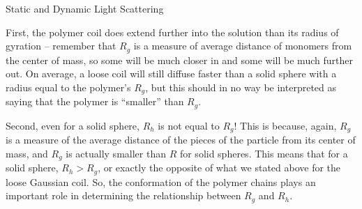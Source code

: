 \begin{activity}{Static and Dynamic Light Scattering}
\begin{exercises}
\begin{enumerate}
\begin{solution}{}
First, the polymer coil does extend further into the solution than its radius of gyration – remember that $R_g$ is a measure of average distance of monomers from the center of mass, so some will be much closer in and some will be much further out.  On average, a loose coil will still diffuse faster than a solid sphere with a radius equal to the polymer's $R_g$, but this should in no way be interpreted as saying that the polymer is ``smaller'' than $R_g$.

Second, even for a solid sphere, $R_h$ is not equal to $R_g$!  This is because, again, $R_g$ is a measure of the average distance of the pieces of the particle from its center of mass, and $R_g$ is actually smaller than $R$ for solid spheres.  This means that for a solid sphere, $R_h > R_g$, or exactly the opposite of what we stated above for the loose Gaussian coil.  So, the conformation of the polymer chains plays an important role in determining the relationship between $R_g$ and $R_h$.


				\end{solution}
			
		\end{enumerate}
	
\end{exercises}


%
%	


	
\end{activity}